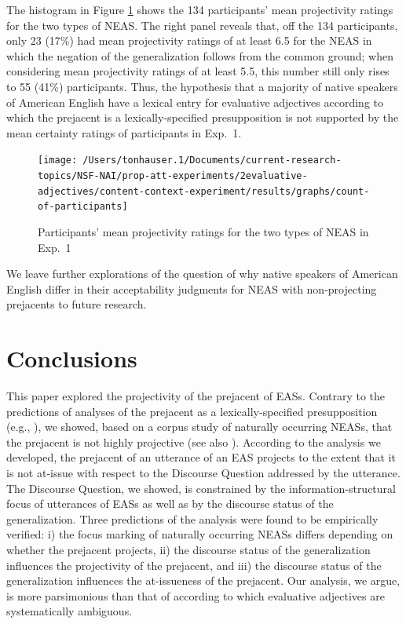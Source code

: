 \documentclass[11pt,fleqn]{article}
\newcommand{\6}{\mbox{$[\hspace*{-.6mm}[$}}
\newcommand{\9}{\mbox{$]\hspace*{-.6mm}]$}}
\begin{document}
The histogram in Figure \ref{f-dialect} shows the 134 participants' mean projectivity ratings for the two types of NEAS. The right panel reveals that, off the 134 participants, only 23 (17\%) had mean projectivity ratings of at least 6.5 for the NEAS in which the negation of the generalization follows from the common ground; when considering mean projectivity ratings of at least 5.5, this number still only rises to 55 (41\%) participants. Thus, the hypothesis that a majority of native speakers of American English have a lexical entry for evaluative adjectives according to which the prejacent is a lexically-specified presupposition is not supported by the mean certainty ratings of participants in Exp.~1. 


\begin{figure}[h!]
\begin{center}
\texttt{[image: /Users/tonhauser.1/Documents/current-research-topics/NSF-NAI/prop-att-experiments/2evaluative-adjectives/content-context-experiment/results/graphs/count-of-participants]}

\caption{Participants' mean projectivity ratings for the two types of NEAS in Exp.~1}\label{f-dialect}
\end{center}
\end{figure}

We leave further explorations of the question of why native speakers of American English differ in their acceptability judgments for NEAS with non-projecting prejacents to future research.

\section{Conclusions}\label{s6}

This paper explored the projectivity of the prejacent of EASs. Contrary to the predictions of analyses of the prejacent as a lexically-specified presupposition (e.g., \citealt{barker02,oshima09b}), we showed, based on a corpus study of naturally occurring NEASs, that the prejacent is not highly projective (see also \citealt{tbd-variability}). According to the analysis we developed, the prejacent of an utterance of an EAS projects to the extent that it is not at-issue with respect to the Discourse Question addressed by the utterance. The Discourse Question, we showed, is constrained by the information-structural focus of utterances of EASs as well as by the discourse status of the generalization. Three predictions of the analysis were found to be empirically verified: i) the focus marking of naturally occurring NEASs differs depending on whether the prejacent projects, ii) the discourse status of the generalization influences the projectivity of the prejacent, and iii) the discourse status of the generalization influences the at-issueness of the prejacent. Our analysis, we argue, is more parsimonious than that of \citealt{karttunen-etal2014} according to which evaluative adjectives are systematically ambiguous.
\end{document}
